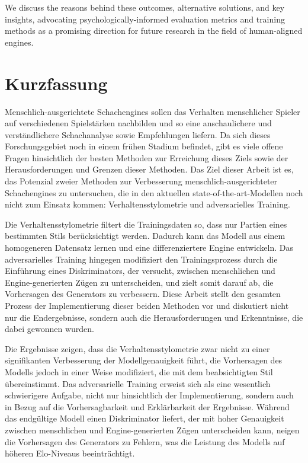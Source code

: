 \documentclass[
  a4paper,  %
  twoside,  %
  bibliography=totoc,
  headsepline,
  cleardoublepage=empty,
  parskip=half,
  draft=false
]{scrbook}
\begin{document}
We discuss the reasons behind these outcomes, alternative solutions, and key insights, advocating psychologically-informed evaluation metrics and training methods as a promising direction for future research in the field of human-aligned engines.
\clearpage
\section*{Kurzfassung}
Menschlich-ausgerichtete Schachengines sollen das Verhalten menschlicher Spieler auf verschiedenen Spielstärken nachbilden und so eine anschaulichere und verständlichere Schachanalyse sowie Empfehlungen liefern.
Da sich dieses Forschungsgebiet noch in einem frühen Stadium befindet, gibt es viele offene Fragen hinsichtlich der besten Methoden zur Erreichung dieses Ziels sowie der Herausforderungen und Grenzen dieser Methoden.
Das Ziel dieser Arbeit ist es, das Potenzial zweier Methoden zur Verbesserung menschlich-ausgerichteter Schachengines zu untersuchen, die in den aktuellen state-of-the-art-Modellen noch nicht zum Einsatz kommen: Verhaltensstylometrie und adversarielles Training.

Die Verhaltensstylometrie filtert die Trainingsdaten so, dass nur Partien eines bestimmten Stils berücksichtigt werden. Dadurch kann das Modell aus einem homogeneren Datensatz lernen und eine differenziertere Engine entwickeln.
Das adversarielles Training hingegen modifiziert den Trainingsprozess durch die Einführung eines Diskriminators, der versucht, zwischen menschlichen und Engine-generierten Zügen zu unterscheiden, und zielt somit darauf ab, die Vorhersagen des Generators zu verbessern.
Diese Arbeit stellt den gesamten Prozess der Implementierung dieser beiden Methoden vor und diskutiert nicht nur die Endergebnisse, sondern auch die Herausforderungen und Erkenntnisse, die dabei gewonnen wurden.

Die Ergebnisse zeigen, dass die Verhaltensstylometrie zwar nicht zu einer signifikanten Verbesserung der Modellgenauigkeit führt, die Vorhersagen des Modells jedoch in einer Weise modifiziert, die mit dem beabsichtigten Stil übereinstimmt.
Das adversarielle Training erweist sich als eine wesentlich schwierigere Aufgabe, nicht nur hinsichtlich der Implementierung, sondern auch in Bezug auf die Vorhersagbarkeit und Erklärbarkeit der Ergebnisse.
Während das endgültige Modell einen Diskriminator liefert, der mit hoher Genauigkeit zwischen menschlichen und Engine-generierten Zügen unterscheiden kann, neigen die Vorhersagen des Generators zu Fehlern, was die Leistung des Modells auf höheren Elo-Niveaus beeinträchtigt.
\end{document}
